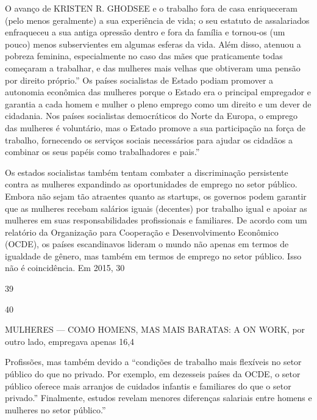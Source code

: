  \par 
O avanço de KRISTEN R. GHODSEE e o trabalho fora de casa enriqueceram (pelo menos geralmente) a sua experiência de vida; o seu estatuto de assalariados enfraqueceu a sua antiga opressão dentro e fora da família e tornou-os (um pouco) menos subservientes em algumas esferas da vida. Além disso, atenuou a pobreza feminina, especialmente no caso das mães que praticamente todas começaram a trabalhar, e das mulheres mais velhas que obtiveram uma pensão por direito próprio.” Os países socialistas de Estado podiam promover a autonomia econômica das mulheres porque o Estado era o principal empregador e garantia a cada homem e mulher o pleno emprego como um direito e um dever de cidadania. Nos países socialistas democráticos do Norte da Europa, o emprego das mulheres é voluntário, mas o Estado promove a sua participação na força de trabalho, fornecendo os serviços sociais necessários para ajudar os cidadãos a combinar os seus papéis como trabalhadores e pais.”
 \par 
Os estados socialistas também tentam combater a discriminação persistente contra as mulheres expandindo as oportunidades de emprego no setor público. Embora não sejam tão atraentes quanto as startups, os governos podem garantir que as mulheres recebam salários iguais (decentes) por trabalho igual e apoiar as mulheres em suas responsabilidades profissionais e familiares. De acordo com um relatório da Organização para Cooperação e Desenvolvimento Econômico (OCDE), os países escandinavos lideram o mundo não apenas em termos de igualdade de gênero, mas também em termos de emprego no setor público. Isso não é coincidência. Em 2015, 30%
 \par 
39
 \par 
40
 \par 
MULHERES — COMO HOMENS, MAS MAIS BARATAS: A ON WORK, por outro lado, empregava apenas 16,4%
 \par 
Profissões, mas também devido a “condições de trabalho mais flexíveis no setor público do que no privado. Por exemplo, em dezesseis países da OCDE, o setor público oferece mais arranjos de cuidados infantis e familiares do que o setor privado.” Finalmente, estudos revelam menores diferenças salariais entre homens e mulheres no setor público.”
